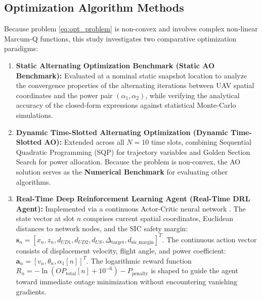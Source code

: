 \subsection*{Optimization Algorithm Methods}

Because problem \eqref{eq:opt_problem} is non-convex and involves complex non-linear Marcum-Q functions, this study investigates two comparative optimization paradigms:
\begin{enumerate}
    \item \textbf{Static Alternating Optimization Benchmark (Static AO Benchmark):} Evaluated at a nominal static snapshot location to analyze the convergence properties of the alternating iterations between UAV spatial coordinates and the power pair $(\alpha_1, \alpha_2)$, while verifying the analytical accuracy of the closed-form expressions against statistical Monte-Carlo simulations.
    \item \textbf{Dynamic Time-Slotted Alternating Optimization (Dynamic Time-Slotted AO):} Extended across all $N = 10$ time slots, combining Sequential Quadratic Programming (SQP) for trajectory variables and Golden Section Search for power allocation. Because the problem is non-convex, the AO solution serves as the \textbf{Numerical Benchmark} for evaluating other algorithms.
    \item \textbf{Real-Time Deep Reinforcement Learning Agent (Real-Time DRL Agent):} Implemented via a continuous Actor-Critic neural network \cite{lillicrap2015continuous}. The state vector at slot $n$ comprises current spatial coordinates, Euclidean distances to network nodes, and the SIC safety margin: $\mathbf{s}_n = [x_n, z_n, d_{UD1}, d_{UD2}, d_{US}, \Delta_{\text{target}}, d_{\text{sic\_margin}}]^T$. The continuous action vector consists of displacement velocity, flight angle, and power coefficient: $\mathbf{a}_n = [v_n, \theta_n, \alpha_1[n]]^T$. The logarithmic reward function $R_n = -\ln(OP_{\text{total}}[n] + 10^{-6}) - P_{\text{penalty}}$ is shaped to guide the agent toward immediate outage minimization without encountering vanishing gradients.
\end{enumerate}
